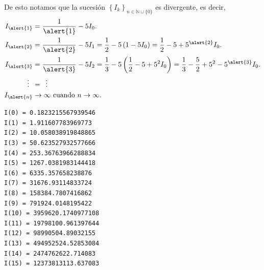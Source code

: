 \begin{frame}[fragile]
	\begin{solution}
		De esto notamos que la sucesión
		\begin{math}
			\left\{I_{k}\right\}_{n\in\mathbb{N}\cup\{0\}}
		\end{math}
		es \alert{divergente}, es decir,
		\begin{align*}
			I_{\alert{1}}     & =
			\frac{1}{\alert{1}}-
			5I_{0}.                                  \\
			I_{\alert{2}}     & =
			\frac{1}{\alert{2}}-
			5I_{1}=
			\frac{1}{2}-
			5\left(1-5I_{0}\right)=
			\frac{1}{2}-
			5+5^{\alert{2}}I_{0}.                    \\
			I_{\alert{3}}     & =
			\frac{1}{\alert{3}}-
			5I_{2}=
			\frac{1}{3}-
			5\left(\frac{1}{2}-
			5+5^{2}I_{0}\right)=
			\frac{1}{3}-
			\frac{5}{2}+5^{2}-5^{\alert{3}}I_{0}.    \\
			\vdots\phantom{0} & =  \phantom{0}\vdots \\
			I_{\alert{n}}     & \to
			\infty\text{ cuando }n\to\infty.
		\end{align*}

		\footnotesize
		\centering
		\begin{verbatim}
I(0) = 0.1823215567939546
I(1) = 1.911607783969773
I(2) = 10.058038919848865
I(3) = 50.623527932577666
I(4) = 253.36763966288834
I(5) = 1267.0381983144418
I(6) = 6335.357658238876
I(7) = 31676.93114833724
I(8) = 158384.7807416862
I(9) = 791924.0148195422
I(10) = 3959620.1740977108
I(11) = 19798100.961397644
I(12) = 98990504.89032155
I(13) = 494952524.52853084
I(14) = 2474762622.714083
I(15) = 12373813113.637083
		\end{verbatim}
	\end{solution}
\end{frame}

